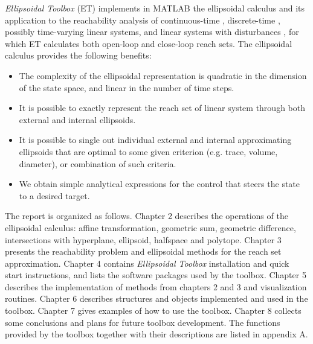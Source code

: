 \documentclass{report}
\begin{document}
{\it Ellipsoidal Toolbox} (ET) implements in MATLAB
the ellipsoidal calculus \cite{kurvalyi}
and its application to the reachability analysis of continuous-time
\cite{kurvar}, discrete-time \cite{pvak}, possibly time-varying linear systems,
and linear systems with disturbances \cite{kurvar2},
for which ET calculates both open-loop and close-loop reach sets.
The ellipsoidal calculus provides the following benefits:
\begin{itemize}
\item The complexity of the
ellipsoidal representation is quadratic in the dimension of
the state space, and linear in the number of time steps.
\item It is possible to exactly represent the reach set of
linear system through both external and internal ellipsoids.
\item It is possible to single out individual external and internal
approximating ellipsoids that are optimal to some given criterion
(e.g. trace, volume, diameter), or combination of such criteria.
\item We obtain simple analytical expressions for the control
that steers the state to a desired target.
\end{itemize}
The report is organized as follows.
\newline
Chapter 2 describes the operations of the
ellipsoidal calculus: affine transformation, geometric sum,
geometric difference, intersections with
hyperplane, ellipsoid, halfspace and polytope.
\newline
Chapter 3 presents the reachability problem and ellipsoidal methods for
the reach set approximation.
\newline
Chapter 4 contains {\it Ellipsoidal Toolbox} installation and quick start
instructions, and lists the software packages used by the toolbox.
\newline
Chapter 5 describes the implementation of methods from chapters 2 and 3
and visualization routines.
\newline
Chapter 6 describes structures and objects implemented and
used in the toolbox.
\newline
Chapter 7 gives examples of how to use the toolbox.
\newline
Chapter 8 collects some conclusions and plans for future toolbox development.
\newline
The functions provided by the toolbox together with their descriptions
are listed in appendix A.
\end{document}
